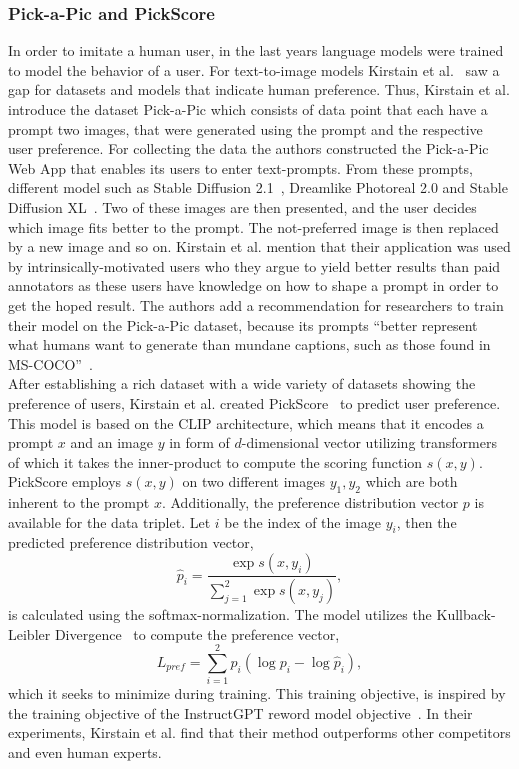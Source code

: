 \subsubsection{Pick-a-Pic and PickScore}
\label{sec:wuerstchen:PickScore}
In order to imitate a human user, in the last years language models were trained
to model the behavior of a user. For text-to-image models Kirstain et
al.~\cite{kirstain2023pickapic} saw a gap for datasets and models that
indicate human preference. Thus, Kirstain et al. introduce the dataset
Pick-a-Pic which consists of data point that each have a prompt two images, that
were generated using the prompt and the respective user preference. For
collecting the data the authors constructed the Pick-a-Pic Web App that enables
its users to enter text-prompts. From these prompts, different model such as
Stable Diffusion 2.1~\cite{rombach2023sd_2_1}, Dreamlike Photoreal 2.0 and
Stable Diffusion XL~\cite{podell2024sdxl}. Two of these images are then
presented, and the user decides which image fits better to the prompt. The
not-preferred image is then replaced by a new image and so on. Kirstain et al.
mention that their application was used by intrinsically-motivated users who
they argue to yield better results than paid annotators as these users have
knowledge on how to shape a prompt in order to get the hoped result. The authors
add a recommendation for researchers to train their model on the Pick-a-Pic
dataset, because its prompts ``better represent what humans want to generate
than mundane captions, such as those found in MS-COCO''~\cite{kirstain2023pickapic}.\\

After establishing a rich dataset with a wide variety of datasets showing the
preference of users, Kirstain et al. created PickScore~\cite{kirstain2023pickapic}
to predict user preference. This model is based on the CLIP architecture, which
means that it encodes a prompt $x$ and an image $y$ in form of $d$-dimensional
vector utilizing transformers of which it takes the inner-product to compute the scoring function
$s(x, y)$. PickScore employs $s(x, y)$ on two different images $y_1, y_2$ which
are both inherent to the prompt $x$. Additionally, the preference distribution
vector $p$ is available for the data triplet. Let $i$ be the index of the image
$y_i$, then the predicted preference distribution vector,
\begin{equation}
    \hat{p}_i = \frac{\exp s(x, y_i)}{\sum_{j=1}^{2}\exp s(x, y_j)},
\end{equation}
is calculated using the softmax-normalization. The model utilizes the
Kullback-Leibler Divergence~\cite{kullback1951OnInformationandSufficiency} to compute the preference vector,
\begin{equation}
    L_{pref} = \sum_{i=1}^{2} p_i (\log p_i - \log\hat{p}_i),
\end{equation}
which it seeks to minimize during training. This training objective, is inspired
by the training objective of the InstructGPT reword model
objective~\cite{Ouyang2024InstructGPT}. In their experiments, Kirstain et al.
find that their method outperforms other competitors and even human experts.

